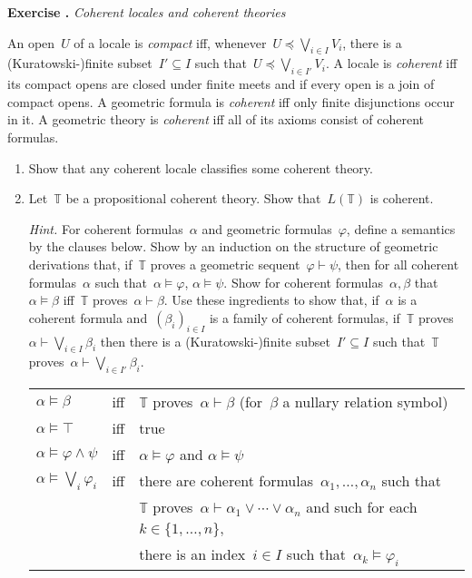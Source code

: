 \documentclass{ws-rv9x6}
\newlength{\exerciseskip}
\newcounter{exercisenr}
\newenvironment{exercise}[1]{
  \refstepcounter{exercisenr}
  \noindent\textbf{Exercise \theexercisenr{}.} \emph{#1} \smallskip\par\noindent%
}{\par\vspace{\exerciseskip}}
\newcommand{\TT}{\mathbb{T}}
\renewcommand{\_}{\mathpunct{.}}
\newcommand{\?}{\,{:}\,}
\begin{document}
\begin{exercise}{Coherent locales and coherent theories}%
An open~$U$ of a locale is \emph{compact} iff, whenever~$U
\preceq \bigvee_{i \in I} V_i$, there is a (Kuratowski-)finite subset~$I'
\subseteq I$ such that~$U \preceq \bigvee_{i \in I'} V_i$. A locale is
\emph{coherent} iff its compact opens are closed under finite meets and if
every open is a join of compact opens. A geometric formula is \emph{coherent} iff only
finite disjunctions occur in it. A geometric theory is \emph{coherent}
iff all of its axioms consist of coherent formulas.
\begin{enumerate}
\item Show that any coherent locale classifies some coherent theory.
\item Let~$\TT$ be a propositional coherent theory. Show that~$L(\TT)$ is
coherent.

{\scriptsize\emph{Hint.} For coherent formulas~$\alpha$ and geometric
formulas~$\varphi$, define a semantics by the clauses below. Show by an induction on the
structure of geometric derivations that, if~$\TT$ proves a geometric
sequent~$\varphi \vdash \psi$, then for all coherent formulas~$\alpha$ such
that~$\alpha \models \varphi$, $\alpha \models \psi$. Show for coherent
formulas~$\alpha,\beta$ that~$\alpha \models \beta$ iff~$\TT$ proves~$\alpha
\vdash \beta$. Use these ingredients to show that, if~$\alpha$ is a coherent
formula and~$(\beta_i)_{i \in I}$ is a family of coherent formulas, if~$\TT$
proves~$\alpha \vdash \bigvee_{i \in I} \beta_i$ then there is a
(Kuratowski-)finite subset~$I' \subseteq I$ such that~$\TT$ proves~$\alpha
\vdash \bigvee_{i \in I'} \beta_i$.

\begin{center}\tablefont
\begin{tabular}{@{}l@{\ \ }c@{\ \ }l@{}}
  $\alpha \models \beta$ &iff& $\TT$ proves~$\alpha \vdash \beta$ \qquad(for~$\beta$ a nullary relation symbol) \\
  $\alpha \models \top$ &iff& true \\
  $\alpha \models \varphi \wedge \psi$ &iff& $\alpha \models \varphi$ and $\alpha \models \psi$ \\
  $\alpha \models \bigvee_i \varphi_i$ &iff& there are coherent
  formulas~$\alpha_1,\ldots,\alpha_n$ such that \\ &&\qquad $\TT$ proves~$\alpha \vdash
  \alpha_1 \vee \cdots \vee \alpha_n$ and such for each~$k \in \{1,\ldots,n\}$,
  \\ &&\qquad\qquad there is an index~$i \in I$ such that~$\alpha_k \models \varphi_i$
\end{tabular}
\end{center}}


\end{enumerate}
\end{exercise}
\end{document}
